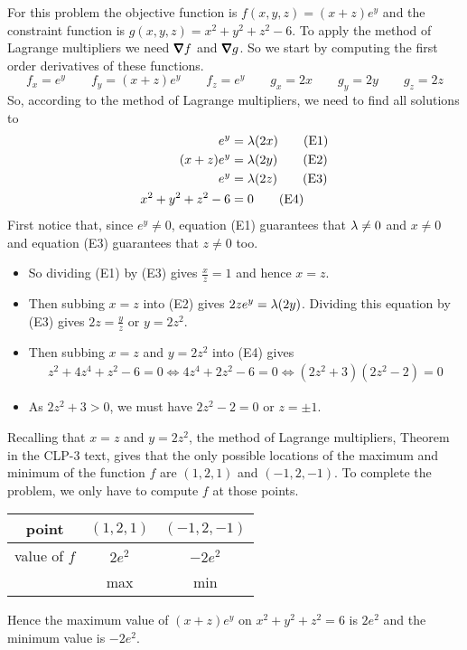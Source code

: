 \begin{solution}
For this problem the objective function is $f(x,y,z) = (x + z)e^y$
and the constraint function is $g(x,y,z)=x^2 + y^2 + z^2 -6$. 
To apply the method of Lagrange multipliers we need $\vnabla f$
and $\vnabla g$. So we start by computing the first order derivatives
of these functions.
\begin{equation*}
f_x=e^y\qquad
f_y=(x+z)e^y\qquad
f_z=e^y\qquad
g_x=2x\qquad
g_y=2y\qquad
g_z=2z
\end{equation*}
So, according to the method of Lagrange multipliers, we need to find all solutions to
\begin{align*}
e^y&=\lambda (2x) \tag{E1}\\
(x+z)e^y&=\lambda (2y)  \tag{E2}\\
e^y&=\lambda (2z) \tag{E3}\\
x^2+y^2+z^2-6&=0 \tag{E4}
\end{align*}
First notice that, since $e^y\ne 0$, equation (E1) guarantees
that $\lambda\ne 0$ and $x\ne 0$ and equation (E3) guarantees that
$z\ne 0$ too. 
\begin{itemize}
\item 
So dividing (E1) by (E3) gives $\frac{x}{z}=1$ and hence $x=z$.
\item
Then subbing $x=z$ into (E2) gives $2z e^y = \lambda(2y)$. Dividing
this equation by (E3) gives $2z=\frac{y}{z}$ or $y=2z^2$.
\item
Then subbing $x=z$ and $y=2z^2$ into (E4) gives
\begin{align*}
z^2+4z^4+z^2-6=0 \iff 4z^4 +2z^2 -6 = 0
                 \iff (2z^2+3)(2z^2-2) =0
\end{align*}
\item
As $2z^2+3>0$, we must have $2z^2-2=0$ or $z=\pm 1$.
\end{itemize}


Recalling that $x=z$ and $y=2z^2$, 
the method of Lagrange multipliers, Theorem 
in the CLP-3 text, gives
that the only possible locations of the maximum and minimum of the function
$f$ are $(1,2,1)$ and $(-1,2,-1)$. To complete the problem, we only have to 
compute $f$ at those points.
\begin{center}
\renewcommand{\arraystretch}{1.3}
     \begin{tabular}{|c|c|c|}
     \hline
       point
       &$(1,2,1)$
       &$(-1,2,-1)$ \\ \hline
       value of $f$
       &$2e^2$
       &$-2e^2$ \\ \hline
       &max 
       &min  \\ \hline
     \end{tabular}
\renewcommand{\arraystretch}{1.0}
\end{center}
Hence the maximum value of $(x + z)e^y$ on $x^2 + y^2 + z^2 = 6$ 
is $2e^2$ and the minimum value is $-2 e^2$.
\end{solution}

